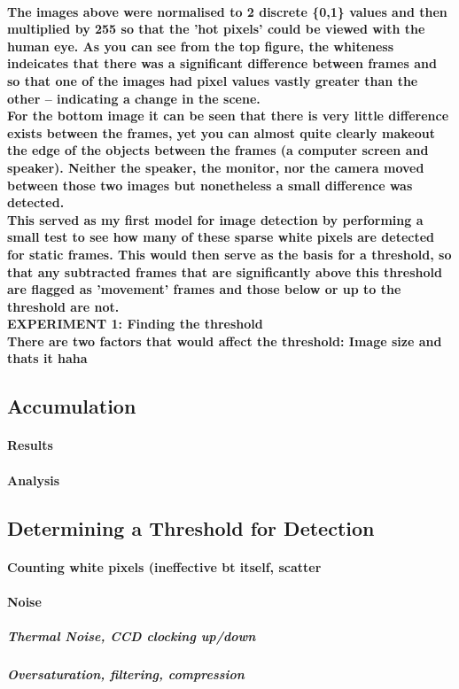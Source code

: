 \documentclass[11pt]{article} %
\begin{document}
\paragraph{The images above were normalised to 2 discrete \{0,1\} values and then multiplied by 255 so that the 'hot pixels' could be viewed with the human eye. As you can see from the top figure, the whiteness indeicates that there was a significant difference between frames and so that one of the images had pixel values vastly greater than the other -- indicating a change in the scene.
\\For the bottom image it can be seen that there is very little difference exists between the frames, yet you can almost quite clearly makeout the edge of the objects between the frames (a computer screen and speaker). Neither the speaker, the monitor, nor the camera moved between those two images but nonetheless a small difference was detected.\\
This served as my first model for image detection by performing a small test to see how many of these sparse white pixels are detected for static frames. This would then serve as the basis for a threshold, so that any subtracted frames that are significantly above this threshold are flagged as 'movement' frames and those below or up to the threshold are not.
\\EXPERIMENT 1: Finding the threshold
\\There are two factors that would affect the threshold: Image size and thats it haha
}

\subsection{Accumulation}
\paragraph{Results}
\paragraph{Analysis}
\subsection{Determining a Threshold for Detection}
\paragraph{Counting white pixels (ineffective bt itself, scatter}
\paragraph{Noise}
\subparagraph{Thermal Noise, CCD clocking up/down}
\subparagraph{Oversaturation, filtering, compression}
\end{document}
